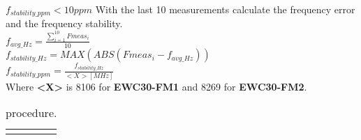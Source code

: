 	\begin{stepstable}{\subprocid{} \procname{}}
		\CopyCegseLogsForEvicences{}{\pasarSiDespues \guardarLogs}

		{%
		 $f_{stability\_ppm}<10 ppm $}{
		 With the last 10 measurements calculate the frequency error and the frequency stability.\\
		 $f_{avg\_Hz} = \frac{\sum_{i=1}^{10} Fmeas_{i}}{10}$ \\ 
		 $f_{stability\_Hz} = MAX(ABS(Fmeas_{i} - f_{avg\_Hz}))$\\ 
		
		 $f_{stability\_ppm} = \frac{f_{stability\_Hz}}{<X>[MHz]}$\\
         \vspace{5mm}
		 Where \textbf{<X>} is 8106 for \textbf{EWC30-FM1} and
		 8269 for \textbf{EWC30-FM2}.
		 }

	\RegisterTemp
	\RegisterHumidity
	
\end{stepstable}
\begin{longtable}{|p{17.0cm}|}
	\endfirsthead
	\endfoot
	\caption{\subprocid{} procedure.}
\end{longtable}
